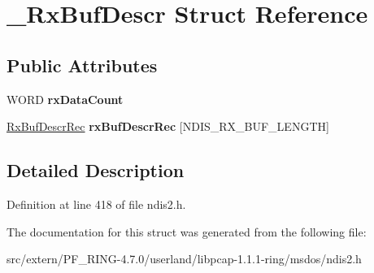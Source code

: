 \hypertarget{struct___rx_buf_descr}{
\section{\_\-RxBufDescr Struct Reference}
\label{struct___rx_buf_descr}
}
\subsection*{Public Attributes}
\begin{DoxyCompactItemize}
\item 
\hypertarget{struct___rx_buf_descr_a1e241b800e18930dcfbe7fc148c73450}{
WORD {\bfseries rxDataCount}}
\label{struct___rx_buf_descr_a1e241b800e18930dcfbe7fc148c73450}

\item 
\hypertarget{struct___rx_buf_descr_aa708bda336fb744801bc94fcab72eee3}{
\hyperlink{struct___rx_buf_descr_rec}{RxBufDescrRec} {\bfseries rxBufDescrRec} \mbox{[}NDIS\_\-RX\_\-BUF\_\-LENGTH\mbox{]}}
\label{struct___rx_buf_descr_aa708bda336fb744801bc94fcab72eee3}

\end{DoxyCompactItemize}


\subsection{Detailed Description}


Definition at line 418 of file ndis2.h.



The documentation for this struct was generated from the following file:\begin{DoxyCompactItemize}
\item 
src/extern/PF\_\-RING-\/4.7.0/userland/libpcap-\/1.1.1-\/ring/msdos/ndis2.h\end{DoxyCompactItemize}
